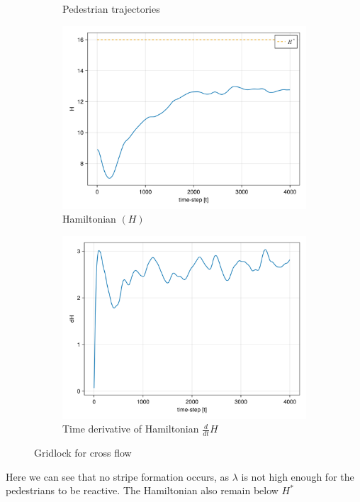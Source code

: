 \begin{itemize}
\begin{figure}[H]
\begin{subfigure}{\textwidth}
            \caption{Pedestrian trajectories}
            \label{plot:crossgridlock_traj}
        \end{subfigure}
        \begin{subfigure}{.40\textwidth}
            \centering
            \includegraphics[width=\linewidth]{figures/H_cross_gridlock.png}
            \caption{Hamiltonian $(H)$}
            \label{plot:crossgridlock_h}
        \end{subfigure}
        \begin{subfigure}{.40\textwidth}
            \centering
            \includegraphics[width=\linewidth]{figures/dH_cross_gridlock.png}
            \caption{Time derivative of Hamiltonian $\frac{d}{dt}H$}
            \label{plot:crossgridlock_dh}
        \end{subfigure}
        \caption{Gridlock for cross flow}
        \label{plot:crossgridlock}
    \end{figure}
Here we can see that no stripe formation occurs, as $\lambda$ is not high enough for the pedestrians to be reactive. The Hamiltonian also remain below $H^*$
\end{itemize}

